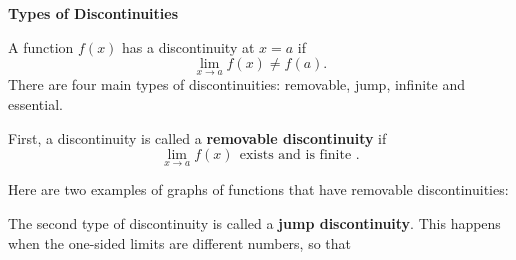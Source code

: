 \documentclass{ximera}
\begin{document}
\begin{center}
\textbf{Types of Discontinuities}
\end{center}

A function $f(x)$ has a discontinuity at $x = a$ if
\[\lim_{x \to a} f(x) \neq f(a).\]
There are four main types of discontinuities: removable, jump, infinite and essential. 

First, a discontinuity is called a \textbf{removable discontinuity} if 
\[\lim_{x \to a} f(x)  \  \  \text{exists and is finite }.\]

Here are two examples of graphs of functions that have removable discontinuities:
\begin{center}
\hspace{1.5 in}
\end{center}


The second type of discontinuity is called a \textbf{jump discontinuity}. 
This happens when the one-sided
limits are different numbers, so that
\end{document}
